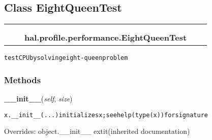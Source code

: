 \subsection{Class EightQueenTest}

    \label{hal:profile:performance:EightQueenTest}
\begin{tabular}{cccccc}
\multicolumn{2}{r}{\settowidth{\BCL}{object}\multirow{2}{\BCL}{object}}
&&
  \\\cline{3-3}
  &&\multicolumn{1}{c|}{}
&&
  \\
&&\multicolumn{2}{l}{\textbf{hal.profile.performance.EightQueenTest}}
\end{tabular}

\begin{alltt}
test CPU by solving eight-queen problem 
\end{alltt}



  \subsubsection{Methods}

    \vspace{0.5ex}

\hspace{.8\funcindent}\begin{boxedminipage}{\funcwidth}

    \raggedright \textbf{\_\_init\_\_}(\textit{self}, \textit{size})

\setlength{\parskip}{2ex}
\begin{alltt}
x.\_\_init\_\_(...) initializes x; see help(type(x)) for signature
\end{alltt}

\setlength{\parskip}{1ex}
      Overrides: object.\_\_init\_\_ 	extit{(inherited documentation)}

    \end{boxedminipage}

    \label{hal:profile:performance:EightQueenTest:welcome}

